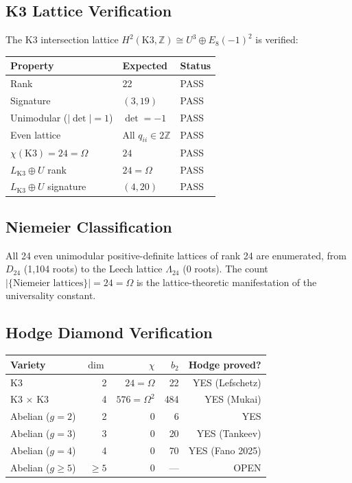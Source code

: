 \documentclass[12pt,a4paper]{article}
\begin{document}
\subsection{K3 Lattice Verification}

The K3 intersection lattice $H^2(\text{K3}, \mathbb{Z}) \cong U^3 \oplus E_8(-1)^2$ is verified:

\begin{center}\small
\begin{tabular}{lll}
\toprule
Property & Expected & Status \\
\midrule
Rank & 22 & \textcolor{proved}{PASS} \\
Signature & $(3,19)$ & \textcolor{proved}{PASS} \\
Unimodular ($|\det| = 1$) & $\det = -1$ & \textcolor{proved}{PASS} \\
Even lattice & All $q_{ii} \in 2\mathbb{Z}$ & \textcolor{proved}{PASS} \\
$\chi(\text{K3}) = 24 = \Omega$ & $24$ & \textcolor{proved}{PASS} \\
$L_{\text{K3}} \oplus U$ rank & $24 = \Omega$ & \textcolor{proved}{PASS} \\
$L_{\text{K3}} \oplus U$ signature & $(4,20)$ & \textcolor{proved}{PASS} \\
\bottomrule
\end{tabular}
\end{center}

\subsection{Niemeier Classification}

All 24 even unimodular positive-definite lattices of rank 24 are enumerated, from $D_{24}$ (1,104 roots) to the Leech lattice $\Lambda_{24}$ (0 roots). The count $|\{\text{Niemeier lattices}\}| = 24 = \Omega$ is the lattice-theoretic manifestation of the universality constant.

\subsection{Hodge Diamond Verification}

\begin{center}\small
\begin{tabular}{lrrrr}
\toprule
Variety & $\dim$ & $\chi$ & $b_2$ & Hodge proved? \\
\midrule
K3 & 2 & $24 = \Omega$ & 22 & \textcolor{proved}{YES} (Lefschetz) \\
K3 $\times$ K3 & 4 & $576 = \Omega^2$ & 484 & \textcolor{proved}{YES} (Mukai) \\
Abelian ($g = 2$) & 2 & 0 & 6 & \textcolor{proved}{YES} \\
Abelian ($g = 3$) & 3 & 0 & 20 & \textcolor{proved}{YES} (Tankeev) \\
Abelian ($g = 4$) & 4 & 0 & 70 & \textcolor{proved}{YES} (Fano 2025) \\
Abelian ($g \geq 5$) & $\geq 5$ & 0 & --- & \textcolor{conditional}{OPEN} \\
\bottomrule
\end{tabular}
\end{center}
\end{document}
